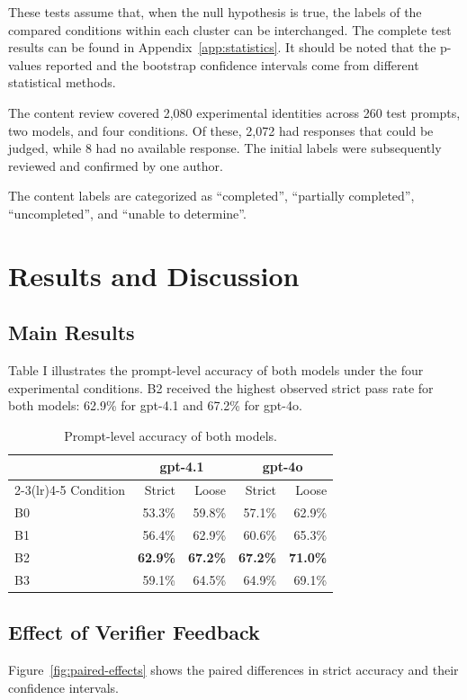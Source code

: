 \documentclass[conference]{IEEEtran}
\begin{document}
These tests assume that, when the null hypothesis is true, the labels of the compared conditions within each cluster can be interchanged. The complete test results can be found in Appendix~\ref{app:statistics}. It should be noted that the p-values reported and the bootstrap confidence intervals come from different statistical methods.

The content review covered 2,080 experimental identities across 260 test prompts, two models, and four conditions. Of these, 2,072 had responses that could be judged, while 8 had no available response. The initial labels were subsequently reviewed and confirmed by one author.

The content labels are categorized as ``completed'', ``partially completed'', ``uncompleted'', and ``unable to determine''.

\section{Results and Discussion}
\subsection{Main Results}
Table I illustrates the prompt-level accuracy of both models under the four experimental conditions. B2 received the highest observed strict pass rate for both models: 62.9\% for gpt-4.1 and 67.2\% for gpt-4o.

\begin{table}[!t]
\caption{Prompt-level accuracy of both models.}
\label{tab:main-results}
\centering
\begin{tabular}{lrrrr}
\toprule
& \multicolumn{2}{c}{gpt-4.1} & \multicolumn{2}{c}{gpt-4o} \\
\cmidrule(lr){2-3}\cmidrule(lr){4-5}
Condition & Strict & Loose & Strict & Loose \\
\midrule
B0 & 53.3\% & 59.8\% & 57.1\% & 62.9\% \\
B1 & 56.4\% & 62.9\% & 60.6\% & 65.3\% \\
B2 & \textbf{62.9\%} & \textbf{67.2\%} & \textbf{67.2\%} & \textbf{71.0\%} \\
B3 & 59.1\% & 64.5\% & 64.9\% & 69.1\% \\
\bottomrule
\end{tabular}
\end{table}
\subsection{Effect of Verifier Feedback}
Figure~\ref{fig:paired-effects} shows the paired differences in strict accuracy and their confidence intervals.
\end{document}
